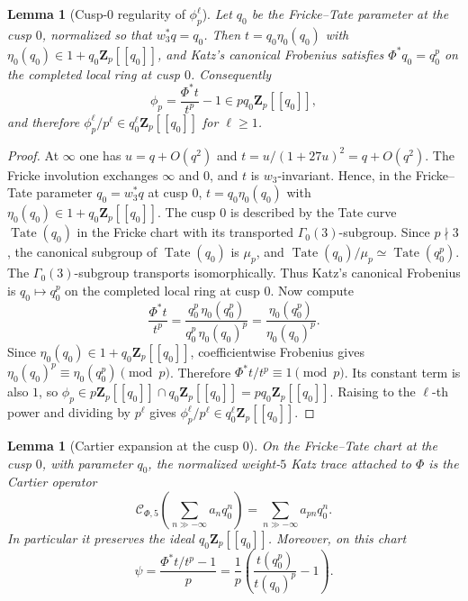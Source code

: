 \documentclass[11pt]{amsart}
\newtheorem{lemma}[theorem]{Lemma}
\theoremstyle{definition}
\theoremstyle{remark}
\newcommand{\Z}{\mathbf{Z}}
\begin{document}
\begin{lemma}[Cusp-$0$ regularity of $\phi_p^\ell$]\label{lem:cusp-0-regularity}
Let $q_0$ be the Fricke--Tate parameter at the cusp $0$, normalized so that $w_3^*q=q_0$. Then $t=q_0\eta_0(q_0)$ with $\eta_0(q_0)\in 1+q_0\Z_p[[q_0]]$, and Katz's canonical Frobenius satisfies $\Phi^*q_0=q_0^p$ on the completed local ring at cusp $0$. Consequently
\[
\phi_p=\frac{\Phi^*t}{t^p}-1\in pq_0\Z_p[[q_0]],
\]
and therefore $\phi_p^\ell/p^\ell\in q_0^\ell\Z_p[[q_0]]$ for $\ell\ge 1$.
\end{lemma}

\begin{proof}
At $\infty$ one has $u=q+O(q^2)$ and $t=u/(1+27u)^2=q+O(q^2)$. The Fricke involution exchanges $\infty$ and $0$, and $t$ is $w_3$-invariant. Hence, in the Fricke--Tate parameter $q_0=w_3^*q$ at cusp $0$, $t=q_0\eta_0(q_0)$ with $\eta_0(q_0)\in 1+q_0\Z_p[[q_0]]$. The cusp $0$ is described by the Tate curve $\operatorname{Tate}(q_0)$ in the Fricke chart with its transported $\Gamma_0(3)$-subgroup. Since $p\nmid 3$, the canonical subgroup of $\operatorname{Tate}(q_0)$ is $\mu_p$, and $\operatorname{Tate}(q_0)/\mu_p\simeq\operatorname{Tate}(q_0^p)$. The $\Gamma_0(3)$-subgroup transports isomorphically. Thus Katz's canonical Frobenius is $q_0\mapsto q_0^p$ on the completed local ring at cusp $0$. Now compute
\[
\frac{\Phi^*t}{t^p}=\frac{q_0^p\,\eta_0(q_0^p)}{q_0^p\,\eta_0(q_0)^p}=\frac{\eta_0(q_0^p)}{\eta_0(q_0)^p}.
\]
Since $\eta_0(q_0)\in 1+q_0\Z_p[[q_0]]$, coefficientwise Frobenius gives $\eta_0(q_0)^p\equiv\eta_0(q_0^p)\pmod p$. Therefore $\Phi^*t/t^p\equiv 1\pmod p$. Its constant term is also $1$, so $\phi_p\in p\Z_p[[q_0]]\cap q_0\Z_p[[q_0]]=pq_0\Z_p[[q_0]]$. Raising to the $\ell$-th power and dividing by $p^\ell$ gives $\phi_p^\ell/p^\ell\in q_0^\ell\Z_p[[q_0]]$.
\end{proof}

\begin{lemma}[Cartier expansion at the cusp $0$]\label{lem:cartier-cusp0-expansion}
On the Fricke--Tate chart at the cusp $0$, with parameter $q_0$, the normalized weight-$5$ Katz trace attached to $\Phi$ is the Cartier operator
\[
\mathcal C_{\Phi,5}\!\left(\sum_{n\gg-\infty}a_nq_0^n\right)=\sum_{n\gg-\infty}a_{pn}q_0^n.
\]
In particular it preserves the ideal $q_0\Z_p[[q_0]]$. Moreover, on this chart
\[
\psi=\frac{\Phi^*t/t^p-1}{p}=\frac{1}{p}\!\left(\frac{t(q_0^p)}{t(q_0)^p}-1\right).
\]
\end{lemma}
\end{document}
